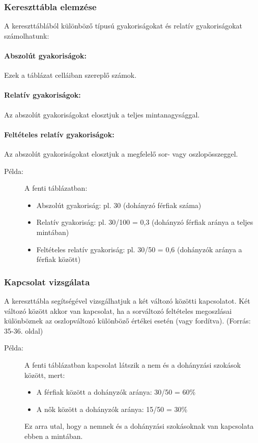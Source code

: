 \documentclass[a4paper,12pt]{article}
\begin{document}
    \subsubsection{Kereszttábla elemzése}

    A kereszttáblából különböző típusú gyakoriságokat és relatív gyakoriságokat számolhatunk:

    \paragraph{Abszolút gyakoriságok:} Ezek a táblázat celláiban szereplő számok.

    \paragraph{Relatív gyakoriságok:} Az abszolút gyakoriságokat elosztjuk a teljes mintanagysággal.

    \paragraph{Feltételes relatív gyakoriságok:} Az abszolút gyakoriságokat elosztjuk a megfelelő sor- vagy oszlopösszeggel.

    \begin{description}
        \item[Példa:] A fenti táblázatban:
        \begin{itemize}
            \item Abszolút gyakoriság: pl. 30 (dohányzó férfiak száma)
            \item Relatív gyakoriság: pl. 30/100 = 0,3 (dohányzó férfiak aránya a teljes mintában)
            \item Feltételes relatív gyakoriság: pl. 30/50 = 0,6 (dohányzók aránya a férfiak között)
        \end{itemize}
    \end{description}

    \subsubsection{Kapcsolat vizsgálata}

    A kereszttábla segítségével vizsgálhatjuk a két változó közötti kapcsolatot. Két változó között akkor van kapcsolat, ha a sorváltozó feltételes megoszlásai különböznek az oszlopváltozó különböző értékei esetén (vagy fordítva).
    (Forrás: 35-36. oldal)

    \begin{description}
        \item[Példa:] A fenti táblázatban kapcsolat látszik a nem és a dohányzási szokások között, mert:
        \begin{itemize}
            \item A férfiak között a dohányzók aránya: 30/50 = 60\%
            \item A nők között a dohányzók aránya: 15/50 = 30\%
        \end{itemize}
        Ez arra utal, hogy a nemnek és a dohányzási szokásoknak van kapcsolata ebben a mintában.
    \end{description}
\end{document}
